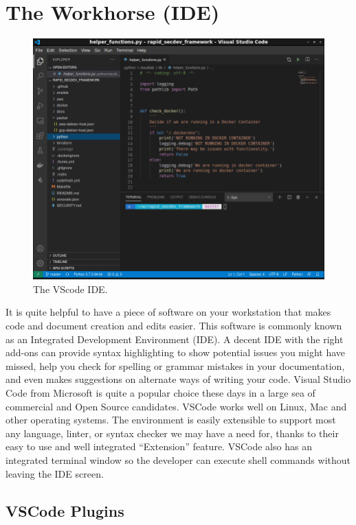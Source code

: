 \section{The Workhorse (IDE)}
\begin{figure}[!htb]
\centering
\includegraphics[scale=0.45]{../images/setup-vscode.png}
\caption{The VScode IDE.}
\end{figure}
\justify{}
It is quite helpful to have a piece of software on your workstation that
makes code and document creation and edits easier. This software is
commonly known as an Integrated Development Environment (IDE).
A decent IDE with the right add-ons can provide syntax highlighting to show
potential issues you might have missed, help you check for spelling or
grammar mistakes in your documentation, and even makes suggestions on
alternate ways of writing your code.
\justify{}
Visual Studio Code from Microsoft is quite a popular choice these
days in a large sea of commercial and Open Source candidates.
VSCode works well on Linux, Mac and other operating systems.
The environment is easily extensible to support most any language,
linter, or syntax checker we may have a need
for, thanks to their easy to use and well integrated ``Extension''
feature. VSCode also has an integrated terminal window
so the developer can execute shell commands without leaving the IDE screen.
\subsection{VSCode Plugins}

